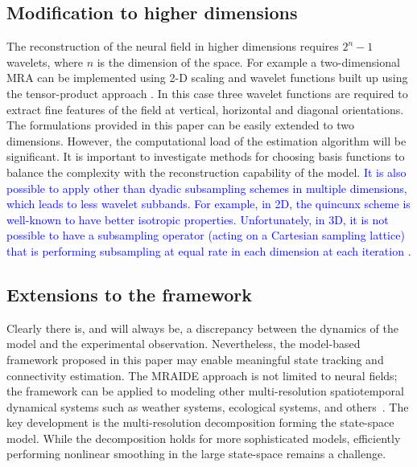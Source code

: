 \documentclass[review,authoryear,3p]{elsarticle}
\newcommand{\parham}[1]{\textcolor{blue}{#1}}
\begin{document}
 \subsection{Modification to higher dimensions}
 The reconstruction of the neural field in higher dimensions requires $2^n-1$ wavelets, where $n$ is the dimension of the space. For example a two-dimensional MRA can be implemented using 2-D scaling and wavelet functions built up using the tensor-product approach \citep{Meyer1992}. In this case three wavelet functions are required to  extract fine features of the field at vertical, horizontal and diagonal orientations. The formulations provided in this paper can be easily extended to two dimensions. However, the computational load of the estimation algorithm will be significant. It is important to investigate methods for choosing basis functions to balance the complexity with the reconstruction capability of the model. \parham{It is also possible to apply other than dyadic subsampling schemes in multiple dimensions, which leads to less wavelet subbands. For example, in 2D, the quincunx scheme is well-known to have better isotropic properties. Unfortunately, in 3D, it is not possible to have a subsampling operator (acting on a Cartesian sampling lattice) that is performing subsampling at equal rate in each dimension at each iteration \citep{VanDeVille2005a}.}
\subsection{Extensions to the framework} 
Clearly there is, and will always be, a discrepancy between the dynamics of the model and the experimental observation. Nevertheless, the model-based framework proposed in this paper may enable meaningful state tracking and connectivity estimation. The MRAIDE approach is not limited to neural fields; the framework can be applied to modeling other multi-resolution spatiotemporal dynamical systems such as weather systems, ecological systems, and others~\citep{Wikle2002,Xu2005}. The key development is the multi-resolution decomposition forming the state-space model. While the decomposition holds for more sophisticated models, efficiently performing nonlinear smoothing in the large state-space remains a challenge.                                                                                                 
\end{document}
